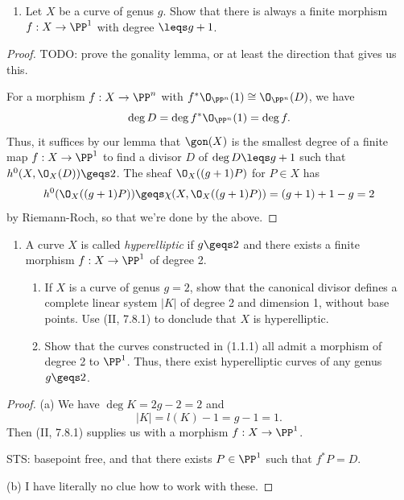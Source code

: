 \documentclass[12pt]{amsart}
\begin{document}
\begin{enumerate}
	\item[6.] {
      Let $X$ be a curve of genus $g$.
      Show that there is always a finite morphism $f:X\to \PP^1$ with degree $\leqs g+1$.
    }
\end{enumerate} 

\begin{proof}
  TODO: prove the gonality lemma, or at least the direction that gives us this.

  For a morphism $f:X\to \PP^n$ with $f^*\O_{\PP^n}(1)\cong \O_{\PP^n}(D)$, we have
  \[
    \deg D= \deg f^*\O_{\PP^n}(1)= \deg f.
  \]
  Thus, it suffices by our lemma that $\gon(X)$ is the smallest degree of a finite map $f:X\to \PP^1$ to find a divisor $D$ of $\deg D\leqs g+1$ such that $h^0(X,\O_X(D))\geqs2$.
  The sheaf $\O_X((g+1)P)$ for $P\in X$ has
  \begin{align*}
    h^0(\O_X((g+1)P))\geqs \chi(X,\O_X((g+1)P)) = (g+1)+1-g= 2
  \end{align*}
  by Riemann-Roch, so that we're done by the above.
\end{proof}

\begin{enumerate}
	\item[7.] {
      A curve $X$ is called \emph{hyperelliptic} if $g\geqs 2$ and there exists a finite morphism $f:X\to \PP^1$ of degree 2.
      \begin{enumerate}
        \item If $X$ is a curve of genus $g=2$, show that the canonical divisor defines a complete linear system $|K|$ of degree 2 and dimension 1, without base points.
          Use (II, 7.8.1) to donclude that $X$ is hyperelliptic.
        \item Show that the curves constructed in (1.1.1) all admit a morphism of degree 2 to $\PP^1$.
          Thus, there exist hyperelliptic curves of any genus $g\geqs 2$.
      \end{enumerate}
    }
\end{enumerate}

\begin{proof}
  (a) We have $\deg K = 2g-2 = 2$ and
  \[
    |K| = l(K) - 1 = g-1=1.
  \] 
  Then (II, 7.8.1) supplies us with a morphism $f:X\to \PP^1$.

  STS: basepoint free, and that there exists $P\in \PP^1$ such that $f^*P= D$.

  (b) I have literally no clue how to work with these.
\end{proof}
\end{document}
